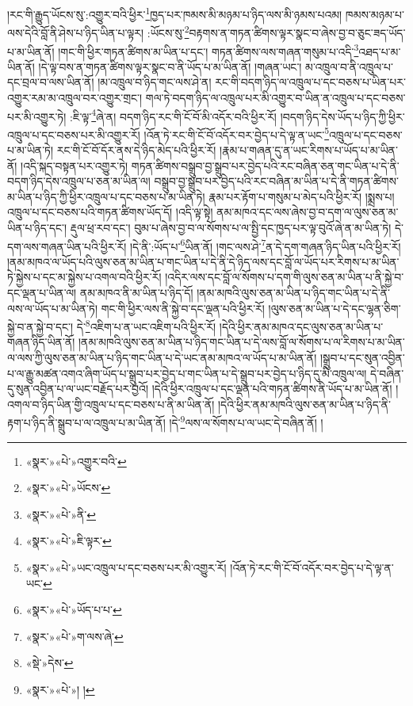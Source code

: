 །རང་གི་རྒྱུད་ཡོངས་སུ་:འགྱུར་བའི་ཕྱིར་\footnote{«སྣར་»«པེ་»འགྱུར་བའི་}ཁྱད་པར་ཁམས་མི་མཉམ་པ་ཉིད་ལས་མི་ཉམས་པའམ། ཁམས་མཉམ་པ་ལས་དེའི་བློ་ནི་ཤེས་པ་ཉིད་ཡིན་པ་ལྟར། :ཡོངས་སུ་\footnote{«སྣར་»«པེ་»ཡོངས་}བརྟགས་ན་གཏན་ཚིགས་ལྟར་སྣང་བ་ཞེས་བྱ་བ་ཅུང་ཟད་ཡོད་པ་མ་ཡིན་ནོ། །གང་གི་ཕྱིར་གཏན་ཚིགས་མ་ཡིན་པ་དང་། གཏན་ཚིགས་ལས་གཞན་གསུམ་པ་འདི་\footnote{«སྣར་»«པེ་»ནི་}འཐད་པ་མ་ཡིན་ནོ། །དེ་ལྟ་བས་ན་གཏན་ཚིགས་ལྟར་སྣང་བ་ནི་ཡོད་པ་མ་ཡིན་ནོ། །གཞན་ཡང་། མ་འཁྲུལ་བ་ནི་འཁྲུལ་པ་དང་བྲལ་བ་ལས་ཡིན་ནོ། །མ་འཁྲུལ་བ་ཉིད་གང་ལས་ཤེ་ན། རང་གི་བདག་ཉིད་ལ་འཁྲུལ་པ་དང་བཅས་པ་ཡིན་པར་འགྱུར་རམ་མ་འཁྲུལ་བར་འགྱུར་གྲང་། གལ་ཏེ་བདག་ཉིད་ལ་འཁྲུལ་པར་མི་འགྱུར་བ་ཡིན་ན་འཁྲུལ་པ་དང་བཅས་པར་མི་འགྱུར་ཏེ། :ཇི་ལྟ་\footnote{«སྣར་»«པེ་»ཇི་ལྟར་}ཞེ་ན། བདག་ཉིད་རང་གི་ངོ་བོ་མི་འདོར་བའི་ཕྱིར་རོ། །བདག་ཉིད་དེས་ཡོད་པ་ཉིད་ཀྱི་ཕྱིར་འཁྲུལ་པ་དང་བཅས་པར་མི་འགྱུར་རོ། །འོན་ཏེ་རང་གི་ངོ་བོ་འདོར་བར་བྱེད་པ་དེ་ལྟ་ན་ཡང་\footnote{«སྣར་»«པེ་»ཡང་འཁྲུལ་པ་དང་བཅས་པར་མི་འགྱུར་རོ། །འོན་ཏེ་རང་གི་ངོ་བོ་འདོར་བར་བྱེད་པ་དེ་ལྟ་ན་ཡང་}འཁྲུལ་པ་དང་བཅས་པ་མ་ཡིན་ཏེ། རང་གི་ངོ་བོ་དོར་ནས་དེ་ཉིད་མེད་པའི་ཕྱིར་རོ། །རྣམ་པ་གཞན་དུ་ན་ཡང་རིགས་པ་ཡོད་པ་མ་ཡིན་ནོ། །འདི་སྐད་བསྟན་པར་འགྱུར་ཏེ། གཏན་ཚིགས་བསྒྲུབ་བྱ་སྒྲུབ་པར་བྱེད་པའི་རང་བཞིན་ཅན་གང་ཡིན་པ་དེ་ནི་བདག་ཉིད་དེས་འཁྲུལ་པ་ཅན་མ་ཡིན་ལ། བསྒྲུབ་བྱ་སྒྲུབ་པར་བྱེད་པའི་རང་བཞིན་མ་ཡིན་པ་དེ་ནི་གཏན་ཚིགས་མ་ཡིན་པ་ཉིད་ཀྱི་ཕྱིར་འཁྲུལ་པ་དང་བཅས་པ་མ་ཡིན་ཏེ། རྣམ་པར་རྟོག་པ་གསུམ་པ་མེད་པའི་ཕྱིར་རོ། །སྨྲས་པ། འཁྲུལ་པ་དང་བཅས་པའི་གཏན་ཚིགས་ཡོད་དོ། །འདི་ལྟ་སྟེ། ནམ་མཁའ་དང་ལས་ཞེས་བྱ་བ་དག་ལ་ལུས་ཅན་མ་ཡིན་པ་ཉིད་དང་། རྡུལ་ཕྲ་རབ་དང་། བུམ་པ་ཞེས་བྱ་བ་ལ་སོགས་པ་ལ་སྤྱི་དང་ཁྱད་པར་ལྟ་བུའོ་ཞེ་ན་མ་ཡིན་ཏེ། དེ་དག་ལས་གཞན་ཡིན་པའི་ཕྱིར་རོ། །དེ་ནི་:ཡོད་པ་\footnote{«སྣར་»«པེ་»ཡོད་པ་པ་}ཡིན་ནོ། །གང་ལས་ཤེ་\footnote{«སྣར་»«པེ་»ག་ལས་ཞེ་}ན་དེ་དག་གཞན་ཉིད་ཡིན་པའི་ཕྱིར་རོ། །ནམ་མཁའ་ལ་ཡོད་པའི་ལུས་ཅན་མ་ཡིན་པ་གང་ཡིན་པ་དེ་ནི་དེ་ཉིད་ལས་དང་བློ་ལ་ཡོད་པར་རིགས་པ་མ་ཡིན་ཏེ་སྐྱེས་པ་དང་མ་སྐྱེས་པ་འགལ་བའི་ཕྱིར་རོ། །འདིར་ལས་དང་བློ་ལ་སོགས་པ་དག་གི་ལུས་ཅན་མ་ཡིན་པ་ནི་སྐྱེ་བ་དང་ལྡན་པ་ཡིན་ལ། ནམ་མཁའ་ནི་མ་ཡིན་པ་ཉིད་དོ། །ནམ་མཁའི་ལུས་ཅན་མ་ཡིན་པ་ཉིད་གང་ཡིན་པ་དེ་ནི་ལས་ལ་ཡོད་པ་མ་ཡིན་ཏེ། གང་གི་ཕྱིར་ལས་ནི་སྐྱེ་བ་དང་ལྡན་པའི་ཕྱིར་རོ། །ལུས་ཅན་མ་ཡིན་པ་དེ་དང་ལྷན་ཅིག་སྐྱེ་བ་ན་སྐྱེ་བ་དང་། དེ་\footnote{«སྡེ་»དེས་}འཇིག་པ་ན་ཡང་འཇིག་པའི་ཕྱིར་རོ། །དེའི་ཕྱིར་ནམ་མཁའ་དང་ལུས་ཅན་མ་ཡིན་པ་གཞན་ཉིད་ཡིན་ནོ། །ནམ་མཁའི་ལུས་ཅན་མ་ཡིན་པ་ཉིད་གང་ཡིན་པ་དེ་ལས་བློ་ལ་སོགས་པ་ལ་རིགས་པ་མ་ཡིན་ལ་ལས་ཀྱི་ལུས་ཅན་མ་ཡིན་པ་ཉིད་གང་ཡིན་པ་དེ་ཡང་ནམ་མཁའ་ལ་ཡོད་པ་མ་ཡིན་ནོ། །སྒྲུབ་པ་དང་སུན་འབྱིན་པ་ལ་རྒྱུ་མཚན་འགའ་ཞིག་ཡོད་པ་སྒྲུབ་པར་བྱེད་པ་གང་ཡིན་པ་དེ་སྒྲུབ་པར་བྱེད་པ་ཉིད་དུ་མི་འཁྲུལ་ལ། དེ་བཞིན་དུ་སུན་འབྱིན་པ་ལ་ཡང་བརྗོད་པར་བྱའོ། །དེའི་ཕྱིར་འཁྲུལ་པ་དང་ལྡན་པའི་གཏན་ཚིགས་ནི་ཡོད་པ་མ་ཡིན་ནོ། །འགལ་བ་ཉིད་ཡིན་གྱི་འཁྲུལ་པ་དང་བཅས་པ་ནི་མ་ཡིན་ནོ། །དེའི་ཕྱིར་ནམ་མཁའི་ལུས་ཅན་མ་ཡིན་པ་ཉིད་ནི་རྟག་པ་ཉིད་ནི་སྒྲུབ་པ་ལ་འཁྲུལ་པ་མ་ཡིན་ནོ། །དེ་\footnote{«སྣར་»«པེ་»། །}ལས་ལ་སོགས་པ་ལ་ཡང་དེ་བཞིན་ནོ། །
